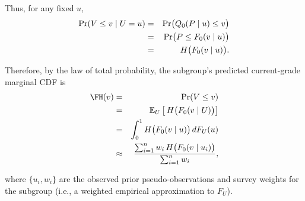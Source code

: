 \documentclass[10pt]{article}
\begin{document}
\begin{minipage}[t]{3.75in}
\begin{minipage}{3.45in}
    \vspace{4pt}
    Thus, for any fixed $u$,
    \begin{eqnarray*}
      \Pr(V\le v\mid U=u)
      &=& \Pr\bigl(Q_0(P\mid u)\le v\bigr) \\
      &=& \Pr\bigl(P\le F_0(v\mid u)\bigr) \\
      &=& H\bigl(F_0(v\mid u)\bigr).
    \end{eqnarray*}

    Therefore, by the law of total probability, the subgroup's predicted current-grade marginal CDF is
    \begin{eqnarray*}
      \FH(v)
      &=& \Pr(V\le v) \\
      &=& \mathbb{E}_{U}\left[\,H\bigl(\Fzero(v\mid U)\bigr)\right] \\
      &=& \int_0^1 H\bigl(\Fzero(v\mid u)\bigr)\,dF_U(u) \\
      &\approx& \frac{\sum_{i=1}^{n} w_i\,H\bigl(\Fzero(v\mid u_i)\bigr)}{\sum_{i=1}^{n} w_i},
    \end{eqnarray*}

    \vspace{1pt}
    where $\{u_i,w_i\}$ are the observed prior pseudo-observations and 
    survey weights for the subgroup (i.e., a weighted empirical approximation to $F_U$).

  \end{minipage}
  \vspace{0.1in}
\end{minipage}
\end{document}
